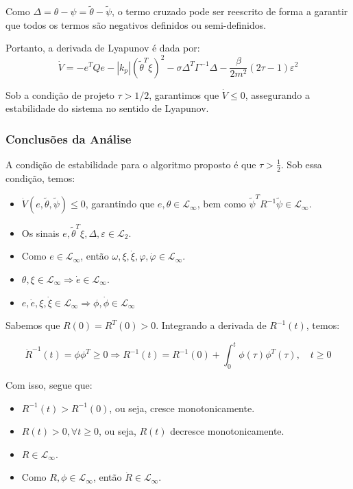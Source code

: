 \documentclass[10pt]{article}
\begin{document}
Como \(\Delta = \theta - \psi = \tilde{\theta} - \tilde{\psi}\), o termo cruzado pode ser reescrito de forma a garantir que todos os termos são negativos definidos ou semi-definidos.

Portanto, a derivada de Lyapunov é dada por:
\begin{equation}
    \dot{V} = -e^T Q e - |k_p| (\tilde{\theta}^T \xi)^2 - \sigma \Delta^T \Gamma^{-1} \Delta - \frac{\beta}{2 m^2}(2\tau - 1) \varepsilon^2
\end{equation}

Sob a condição de projeto \(\tau > 1/2\), garantimos que \(\dot{V} \leq 0\), assegurando a estabilidade do sistema no sentido de Lyapunov.

\subsubsection{Conclusões da Análise}

A condição de estabilidade para o algoritmo proposto é que \( \tau > \frac{1}{2} \). Sob essa condição, temos:

\begin{itemize}
    \item \( \dot{V}(e, \tilde{\theta}, \tilde{\psi}) \leq 0 \), garantindo que \( e, \theta \in \mathcal{L}_\infty \), bem como \( \tilde{\psi}^T R^{-1} \tilde{\psi} \in \mathcal{L}_\infty \).
    \item Os sinais \( e, \tilde{\theta}^T \xi, \Delta, \varepsilon \in \mathcal{L}_2 \).
    \item Como \( e \in \mathcal{L}_\infty \), então \( \omega, \xi, \dot{\xi}, \varphi, \dot{\varphi} \in \mathcal{L}_\infty \).
    \item \( \theta, \xi \in \mathcal{L}_\infty \Rightarrow \dot{e} \in \mathcal{L}_\infty \).
    \item \( e, \dot{e}, \xi, \dot{\xi} \in \mathcal{L}_\infty \Rightarrow \phi, \dot{\phi} \in \mathcal{L}_\infty \)
\end{itemize}

Sabemos que \( R(0) = R^T(0) > 0 \). Integrando a derivada de \( R^{-1}(t) \), temos:

\begin{equation}
    \dot{R}^{-1}(t) = \phi \phi^T \geq 0 \Rightarrow R^{-1}(t) = R^{-1}(0) + \int_0^t \phi(\tau)\phi^T(\tau), \quad t \geq 0
\end{equation}

Com isso, segue que:
\begin{itemize}
    \item \( R^{-1}(t) > R^{-1}(0) \), ou seja, cresce monotonicamente.
    \item \( R(t) > 0, \forall t \geq 0 \), ou seja, \( R(t) \) decresce monotonicamente.
    \item \( R \in \mathcal{L}_\infty \).
    \item Como \( R, \phi \in \mathcal{L}_\infty \), então \( \dot{R} \in \mathcal{L}_\infty \).
\end{itemize}
\end{document}
